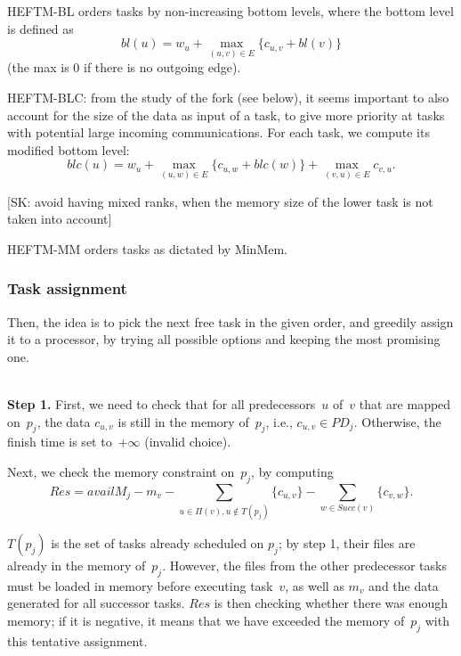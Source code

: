 \documentclass[conference]{IEEEtran}
\newcommand{\skug}[1]{{\color{blue}[SK: #1]}}
\begin{document}
    HEFTM-BL orders tasks by non-increasing bottom levels, where the bottom
    level is defined as
    $$bl(u) = w_u + \max_{(u,v)\in E} \{c_{u,v} + bl(v)\}$$
    (the max is 0 if there is no outgoing edge).

    HEFTM-BLC: from the study of the fork (see below), it seems important
    to also account for the size of the data as input of a task,
    to give more priority at tasks with potential large incoming communications.
    For each task, we compute its modified bottom level:
    $$blc(u) = w_u + \max_{(u,w)\in E} \{c_{u,w} + blc(w)\} + \max_{(v,u)\in E} c_{v,u}   . $$

    \skug{avoid having mixed ranks, when the memory size of the lower task is not taken into account}

    HEFTM-MM orders tasks as dictated by MinMem.

    \subsubsection{Task assignment}

    Then, the idea is to pick the next free task in the given order,
    and greedily assign it to a processor, by trying all possible options
    and keeping the most promising one.

    \medskip
    \\
    {\bf Step 1.} First, we need to check that for all predecessors~$u$ of~$v$ that are mapped
    on~$p_j$, the data $c_{u,v}$ is still in the memory of~$p_j$,
    i.e., $c_{u,v}\in PD_j$. Otherwise, the finish time is set to~$+\infty$ (invalid choice).

    \smallskip
     Next, we check the memory constraint on~$p_j$, by computing
    \[Res = availM_j - m_v - \sum_{u \in \Pi(v), u\notin T(p_j)}  \{c_{u,v}\}
    - \sum_{w\in Succ(v)}  \{c_{v,w}\}.\]

    $T(p_j)$ is the set of tasks already scheduled on $p_j$; by step 1, their files are
    already in the memory of~$p_j$. However, the files from the
    other predecessor tasks must be loaded in memory before executing task~$v$,
    as well as $m_v$ and the data generated for all successor tasks.
    $Res$ is then checking whether there was enough memory; if it is negative,
    it means that we have exceeded the memory of~$p_j$ with this tentative
    assignment.
\end{document}

